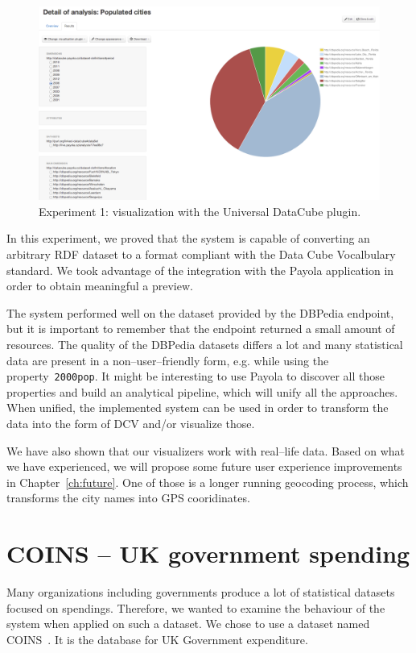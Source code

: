 \begin{figure}
  \centering
  \includegraphics[width=140mm]{img/payola-exp-01-vis2.png}
  \caption{Experiment 1: visualization with the Universal DataCube plugin.}
  \label{fig:payola-exp-01-vis2}
\end{figure}

In this experiment, we proved that the system is capable of converting an 
arbitrary RDF dataset to a format compliant with the Data Cube Vocalbulary 
standard. We took advantage of the integration with the Payola application in 
order to obtain meaningful a preview.

The system performed well on the dataset provided by the DBPedia endpoint, but 
it is important to remember that the endpoint returned a small amount of 
resources. The quality of the DBPedia datasets differs a lot and many 
statistical data are present in a non--user--friendly form, e.g. while using the 
property~\texttt{2000pop}. It might be interesting to use Payola to discover 
all those properties and build an analytical pipeline, which will unify all the 
approaches. When unified, the implemented system can be used in order to 
transform the data into the form of DCV and/or visualize those.

We have also shown that our visualizers work with real--life data. Based on 
what we have experienced, we will propose some future user experience 
improvements in Chapter~\ref{ch:future}. One of those is a longer running 
geocoding process, which transforms the city names into GPS cooridinates.

\section{COINS -- UK government spending}
Many organizations including governments produce a lot of statistical datasets 
focused on spendings. Therefore, we wanted to examine the behaviour of the 
system when applied on such a dataset. We chose to use a dataset named 
COINS~\cite{coins}. It is the database for UK Government expenditure.

